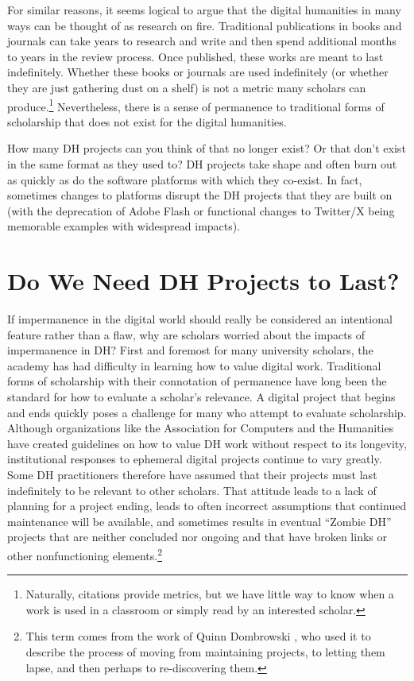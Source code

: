 \documentclass[final]{anthology-ch}
\begin{document}
For similar reasons, it seems logical to argue that the digital humanities in many ways can be thought of as research on fire. Traditional publications in books and journals can take years to research and write and then spend additional months to years in the review process. Once published, these works are meant to last indefinitely. Whether these books or journals are used indefinitely (or whether they are just gathering dust on a shelf) is not a metric many scholars can produce.\footnote{Naturally, citations provide metrics, but we have little way to know when a work is used in a classroom or simply read by an interested scholar.} Nevertheless, there is a sense of permanence to traditional forms of scholarship that does not exist for the digital humanities.

How many DH projects can you think of that no longer exist? Or that don't exist in the same format as they used to? DH projects take shape and often burn out as quickly as do the software platforms with which they co-exist. In fact, sometimes changes to platforms disrupt the DH projects that they are built on (with the deprecation of Adobe Flash or functional changes to Twitter/X being memorable examples with widespread impacts).

\section{Do We Need DH Projects to Last?} \label{sec:need}

If impermanence in the digital world should really be considered an intentional feature rather than a flaw, why are scholars worried about the impacts of impermanence in DH? First and foremost for many university scholars, the academy has had difficulty in learning how to value digital work. Traditional forms of scholarship with their connotation of permanence have long been the standard for how to evaluate a scholar's relevance. A digital project that begins and ends quickly poses a challenge for many who attempt to evaluate scholarship. Although organizations like the Association for Computers and the Humanities \cite{ach2016guidelines} have created guidelines on how to value DH work without respect to its longevity, institutional responses to ephemeral digital projects continue to vary greatly. Some DH practitioners therefore have assumed that their projects must last indefinitely to be relevant to other scholars. That attitude leads to a lack of planning for a project ending, leads to often incorrect assumptions that continued maintenance will be available, and sometimes results in eventual \enquote{Zombie DH} projects that are neither concluded nor ongoing and that have broken links or other nonfunctioning elements.\footnote{This term comes from the work of Quinn Dombrowski \cite{dombrowski2018zombie}, who used it to describe the process of moving from maintaining projects, to letting them lapse, and then perhaps to re-discovering them.}
\end{document}
